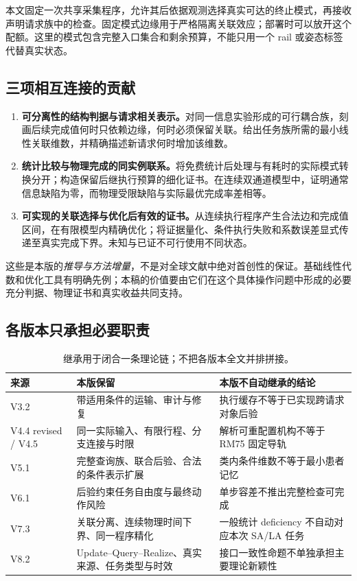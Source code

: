 \documentclass[UTF8,11pt,a4paper,fontset=fandol]{ctexart}
\numberwithin{equation}{section}
\theoremstyle{definition}
\begin{document}
本文固定一次共享采集程序，允许其后依据观测选择真实可达的终止模式，再接收声明请求族中的检查。固定模式边缘用于严格隔离关联效应；部署时可以放开这个配额。这里的模式包含完整入口集合和剩余预算，不能只用一个 rail 或姿态标签代替真实状态。

\subsection{三项相互连接的贡献}
\begin{enumerate}
\item \textbf{可分离性的结构判据与请求相关表示。}对同一信息实验形成的可行耦合族，刻画后续完成值何时只依赖边缘，何时必须保留关联。给出任务族所需的最小线性关联维数，并精确描述新请求何时增加该维数。
\item \textbf{统计比较与物理完成的同实例联系。}将免费统计后处理与有耗时的实际模式转换分开；构造保留后继执行预算的细化证书。在连续双通道模型中，证明通常信息缺陷为零，而物理受限缺陷与实际最优完成率差相等。
\item \textbf{可实现的关联选择与优化后有效的证书。}从连续执行程序产生合法边和完成值区间，在有限模型内精确优化；将证据量化、条件执行失败和系数误差显式传递至真实完成下界。未知与已证不可行使用不同状态。
\end{enumerate}
这些是本版的\emph{推导与方法增量}，不是对全球文献中绝对首创性的保证。基础线性代数和优化工具有明确先例；本稿的价值要由它们在这个具体操作问题中形成的必要充分判据、物理证书和真实收益共同支持。

\subsection{各版本只承担必要职责}
\begin{table}[htbp]\centering\small
\begin{tabularx}{\linewidth}{P{24mm}YY}
\toprule
来源 & 本版保留 & 本版不自动继承的结论\\\midrule
V3.2 & 带适用条件的运输、审计与修复 & 执行缓存不等于已实现跨请求对象后验\\
V4.4 revised / V4.5 & 同一实际输入、有限行程、分支连接与时限 & 解析可重配置机构不等于 RM75 固定导轨\\
V5.1 & 完整查询族、联合后验、合法的条件表示扩展 & 类内条件维数不等于最小患者记忆\\
V6.1 & 后验约束任务自由度与最终动作风险 & 单步容差不推出完整检查可完成\\
V7.3 & 关联分离、连续物理时间下界、同一程序精化 & 一般统计 deficiency 不自动对应本次 SA/LA 任务\\
V8.2 & Update--Query--Realize、真实来源、任务类型与时效 & 接口一致性命题不单独承担主要理论新颖性\\
\bottomrule
\end{tabularx}
\caption{继承用于闭合一条理论链；不把各版本全文并排拼接。}
\end{table}
\end{document}
